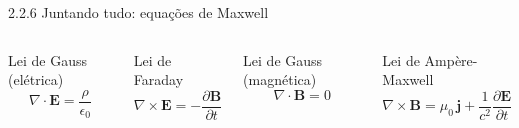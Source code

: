 \documentclass[aspectratio=169]{beamer}
\begin{document}
\begin{frame}{2.2.6 Juntando tudo: equações de Maxwell}
\small
\begin{columns}[T,onlytextwidth]


\begin{block}{Lei de Gauss (elétrica)}
\begin{equation*}
\nabla\cdot\mathbf{E}
=
\frac{\rho}{\epsilon_0}
\end{equation*}
\end{block}

\vspace{0.15cm}

\begin{block}{Lei de Faraday}
\begin{equation*}
\nabla\times\mathbf{E}
=
-\frac{\partial \mathbf{B}}{\partial t}
\end{equation*}
\end{block}


\begin{block}{Lei de Gauss (magnética)}
\begin{equation}
\nabla\cdot\mathbf{B}
=
0
\tag{2.33}
\label{eq:maxwell-233}
\end{equation}
\end{block}

\vspace{0.15cm}

\begin{block}{Lei de Ampère-Maxwell}
\begin{equation}
\nabla\times\mathbf{B}
=
\mu_0\,\mathbf{j}
+
\frac{1}{c^2}\frac{\partial \mathbf{E}}{\partial t}
\tag{2.34}
\label{eq:maxwell-234}
\end{equation}
\end{block}

\end{columns}
\end{frame}
\end{document}
